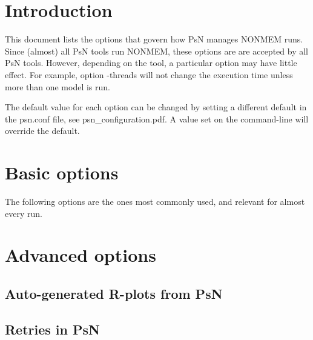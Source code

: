 



\maketitle
\newcommand{\guidetoolname}{<toolname>}

\section{Introduction}
This document lists the options that govern how PsN manages NONMEM runs.
Since (almost) all PsN tools run NONMEM, these options are 
are accepted by all PsN tools. 
However, depending on the tool, a particular option may have little effect. 
For example, option -threads will not change the execution time unless 
more than one model is run. 

The default value for each option can be changed by setting a different default in the psn.conf file, see 
psn\_configuration.pdf. A value set on the command-line will override the default.

\section{Basic options}
The following options are the ones most commonly used, and relevant for almost every run.


\section{Advanced options}
\subsection{Auto-generated R-plots from PsN}
\newcommand{\rplotsconditions}{
Most default templates depend on a couple of R libraries. 
The R-scripts subdirectory contains, in addition to 
all the default templates,
a script required\_packages.R that can be run to install all the packages used
by one or more of the default templates.
If the required R libraries for a particular template are not installed then
no pdf will be generated. Check the .Rout file in the main run directory for error messages.
}


\subsection{Retries in PsN}


